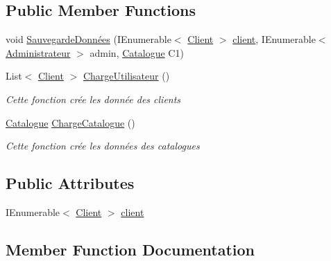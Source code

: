 \subsection*{Public Member Functions}
\begin{DoxyCompactItemize}
\item 
void \hyperlink{classStub_1_1Stub_a3c4b4543b0e2b6cc5915be0ebf537b2e}{Sauvegarde\+Données} (I\+Enumerable$<$ \hyperlink{classModele_1_1Client}{Client} $>$ \hyperlink{classStub_1_1Stub_a2035b814ba0e82a3e4d514a334253c3f}{client}, I\+Enumerable$<$ \hyperlink{classModele_1_1Administrateur}{Administrateur} $>$ admin, \hyperlink{classModele_1_1Catalogue}{Catalogue} C1)
\item 
List$<$ \hyperlink{classModele_1_1Client}{Client} $>$ \hyperlink{classStub_1_1Stub_a8ca776ea5519f9b5f880221f725ee305}{Charge\+Utilisateur} ()
\begin{DoxyCompactList}\small\item\em Cette fonction crée les donnée des clients \end{DoxyCompactList}\item 
\hyperlink{classModele_1_1Catalogue}{Catalogue} \hyperlink{classStub_1_1Stub_a659f8aad0c5123f459f9fabc3779135a}{Charge\+Catalogue} ()
\begin{DoxyCompactList}\small\item\em Cette fonction crée les données des catalogues \end{DoxyCompactList}\end{DoxyCompactItemize}
\subsection*{Public Attributes}
\begin{DoxyCompactItemize}
\item 
I\+Enumerable$<$ \hyperlink{classModele_1_1Client}{Client} $>$ \hyperlink{classStub_1_1Stub_a2035b814ba0e82a3e4d514a334253c3f}{client}
\end{DoxyCompactItemize}


\subsection{Member Function Documentation}
\mbox{\label{classStub_1_1Stub_a659f8aad0c5123f459f9fabc3779135a}} 
